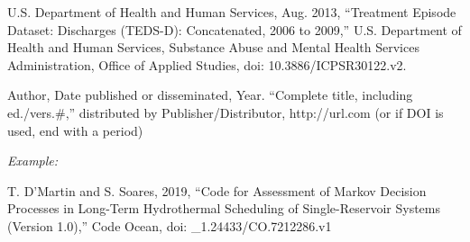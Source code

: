 \documentclass[journal,twoside,web]{ieeecolor}
\begin{document}
\begin{thebibliography}{00}
 U.S. Department of Health and Human Services, Aug. 2013, ``Treatment Episode Dataset: Discharges (TEDS-D): Concatenated, 2006 to 2009,'' U.S. Department of Health and Human Services, Substance Abuse and Mental Health Services Administration, Office of Applied Studies, doi: 10.3886/ICPSR30122.v2.
\end{thebibliography}


\noindent Author,  Date published or disseminated, Year. ``Complete title, including ed./vers.\#,'' distributed by Publisher/Distributor, http://url.com (or if DOI is used, end with a period)

{\it Example:}{\vadjust{\vspace*{-2.5em}}}

\begin{thebibliography}{00}
 T. D'Martin and S. Soares, 2019, ``Code for Assessment of Markov Decision Processes in Long-Term Hydrothermal Scheduling of Single-Reservoir Systems (Version 1.0),'' Code Ocean, doi: \_1.24433/CO.7212286.v1
\end{thebibliography}
\end{document}
